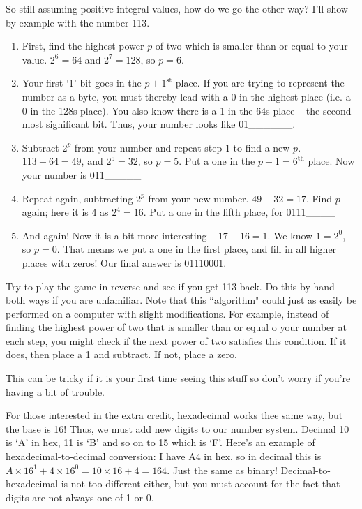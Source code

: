 \documentclass{article}
\begin{document}
So still assuming positive integral values, how do we go the other way? I'll show by example with the number 113.
\begin{enumerate}
	\item First, find the highest power $p$ of two which is smaller than or equal to your value. $2^6=64$ and $2^7=128$, so $p=6$. 
	\item Your first `1' bit goes in the $p+1^{\text{st}}$ place. If you are trying to represent the number as a byte, you must thereby lead with a 0 in the highest place (i.e. a 0 in the 128s place). You also know there is a 1 in the 64s place -- the second-most significant bit. Thus, your number looks like 01\_\_\_\_\_\_.
	\item Subtract $2^p$ from your number and repeat step 1 to find a new $p$. $113 - 64 = 49$, and $2^5 = 32$, so $p=5$. Put a one in the $p+1=6^\text{th}$ place. Now your number is 011\_\_\_\_\_
	\item Repeat again, subtracting $2^p$ from your new number. $49-32=17$. Find $p$ again; here it is 4 as $2^4=16$. Put a one in the fifth place, for 0111\_\_\_\_
	\item And again! Now it is a bit more interesting -- $17-16 = 1$. We know $1 = 2^0$, so $p=0$. That means we put a one in the first place, and fill in all higher places with zeros! Our final answer is 01110001.
\end{enumerate}

Try to play the game in reverse and see if you get 113 back. Do this by hand both ways if you are unfamiliar. Note that this ``algorithm" could just as easily be performed on a computer with slight modifications. For example, instead of finding the highest power of two that is smaller than or equal o your number at each step, you might check if the next power of two satisfies this condition. If it does, then place a 1 and subtract. If not, place a zero.

This can be tricky if it is your first time seeing this stuff so don't worry if you're having a bit of trouble.

For those interested in the extra credit, hexadecimal works thee same way, but the base is 16! Thus, we must add new digits to our number system. Decimal 10 is `A' in hex, 11 is `B' and so on to 15 which is `F'. Here's an example of hexadecimal-to-decimal conversion: I have A4 in hex, so in decimal this is $A\times16^1 + 4\times16^0 = 10\times16 + 4 = 164$. Just the same as binary! Decimal-to-hexadecimal is not too different either, but you must account for the fact that digits are not always one of 1 or 0.
\end{document}
